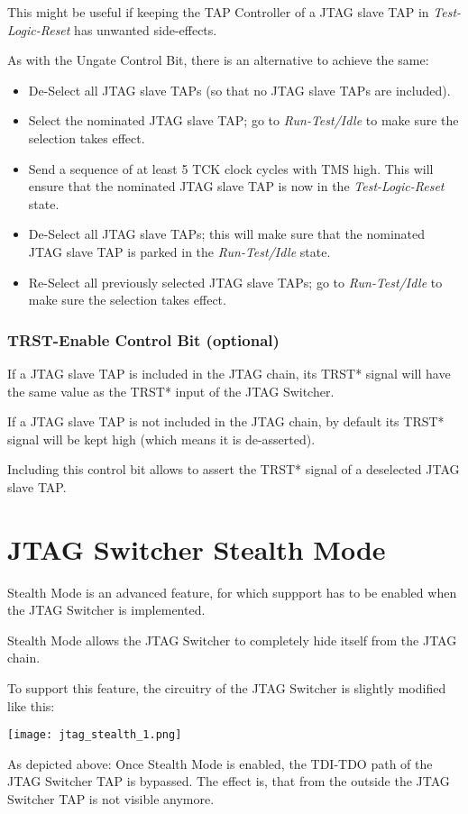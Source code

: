 \documentclass[10pt,english,a4paper]{report}
\begin{document}
This might be useful if keeping the TAP Controller of a JTAG slave TAP in {\em Test-Logic-Reset} has unwanted side-effects.

As with the Ungate Control Bit, there is an alternative to achieve the same:
\begin{itemize}
\item De-Select all JTAG slave TAPs (so that no JTAG slave TAPs are included).
\item Select the nominated JTAG slave TAP; go to {\em Run-Test/Idle} to make sure the selection takes effect.
\item Send a sequence of at least 5 TCK clock cycles with TMS high. This will ensure that the nominated JTAG slave TAP is now in the {\em Test-Logic-Reset} state.
\item De-Select all JTAG slave TAPs; this will make sure that the nominated JTAG slave TAP is parked in the {\em Run-Test/Idle} state.
\item Re-Select all previously selected JTAG slave TAPs; go to {\em Run-Test/Idle} to make sure the selection takes effect.
\end{itemize}


\subsection{TRST-Enable Control Bit (optional)}
If a JTAG slave TAP is included in the JTAG chain, its TRST* signal will have the same value as the TRST* input of the JTAG Switcher.

If a JTAG slave TAP is not included in the JTAG chain, by default its TRST* signal will be kept high (which means it is de-asserted).

Including this control bit allows to assert the TRST* signal of a deselected JTAG slave TAP.



\chapter{JTAG Switcher Stealth Mode}
Stealth Mode is an advanced feature, for which suppport has to be enabled
when the JTAG Switcher is implemented.

Stealth Mode allows the JTAG Switcher to completely hide itself from
the JTAG chain.
\begin {center}

\end {center}

To support this feature, the circuitry of the JTAG Switcher is slightly
modified like this:
\begin{center}
	\texttt{[image: jtag\_stealth\_1.png]}
\end{center}
As depicted above: Once Stealth Mode is enabled, the TDI-TDO path of the
JTAG Switcher TAP is bypassed. The effect is, that from the outside
the JTAG Switcher TAP is not visible anymore.
\end{document}

